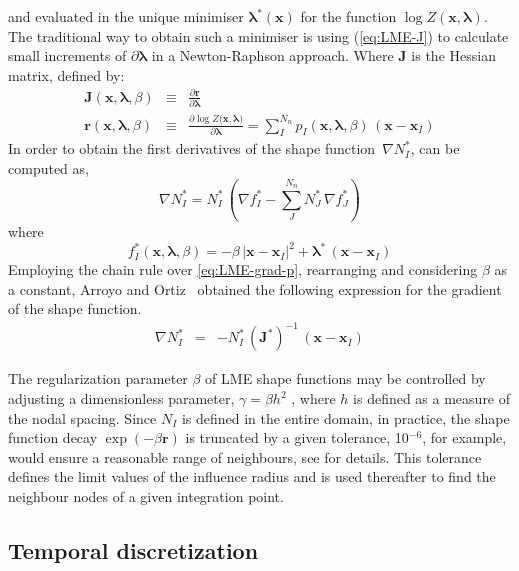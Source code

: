\documentclass[preprint,12pt,a4paper]{elsarticle}
\newcommand{\vec}[1]{
  \ensuremath{\mathbf{{#1}}}
}
\newcommand{\tens}[1]{
  \ensuremath{\mathbf{{#1}}}
}
\begin{document}
and evaluated in the unique minimiser $\vec{\lambda}^*(\vec{x})$ for
the function $\log
Z(\vec{x}, \vec{\lambda})$. The traditional way to obtain such a
minimiser is using (\ref{eq:LME-J}) to calculate small increments of $\partial\vec{\lambda}$ in a
Newton-Raphson approach. Where $\tens{J}$ is the Hessian matrix, defined by:
\begin{eqnarray}
  \label{eq:LME-J} 
  \tens{J}(\vec{x}, \vec{\lambda},\beta) &\equiv& \frac{\partial
                                                  \vec{r}}{\partial \vec{\lambda}}\\
  \label{eq:LME-r}
  \vec{r}(\vec{x},\vec{\lambda},\beta) &\equiv& \frac{\partial \log{ Z(   \vec{x},\vec{\lambda}})}{\partial \vec{\lambda}}  = \sum_I^{N_n} p_I(\vec{x},\vec{\lambda},\beta) \, (\vec{x} - \vec{x}_I)
\end{eqnarray}
In order to obtain the first derivatives of the shape function~$\nabla
N^*_I$, can be computed as,
\begin{equation}
  \label{eq:LME-grad-p}
\nabla N^*_I = N^*_I  \, \left(\nabla f^*_I-\sum_J^{N_n} N^*_J \, \nabla f^*_J\right)
\end{equation}
where
\begin{equation}
  \label{eq:LME-f}
f^*_I(\vec{x},  \vec{\lambda},\beta)=-\beta \, |\vec{x}-\vec{x}_I|^2 + \vec{\lambda}^*  \,  (\vec{x}-\vec{x}_I)
\end{equation}
Employing the chain rule over \eqref{eq:LME-grad-p}, rearranging and considering $\beta$ as a
constant, Arroyo and Ortiz~\cite{Arroyo2006} obtained the following
expression for the gradient of the shape function.
\begin{eqnarray}
  \label{eq:LME-gradp} 
\nabla N^*_I &=& -N^*_I \,  (\tens{J}^*)^{-1} \,  (\vec{x} - \vec{x}_I)
\end{eqnarray}

The regularization parameter $\beta$ of LME shape functions may be
controlled by adjusting a dimensionless parameter, $\gamma=\beta h^2$
\cite{Arroyo2006}, where $h$ is defined as a measure of the nodal
spacing. Since  $N_I$ is defined in the entire domain, in practice,
the shape function decay $\exp(-\beta \vec{r} )$ is truncated  by  a
given tolerance, 10$^{-6}$, for example,  would ensure a reasonable range of
neighbours, see \cite{Arroyo2006} for details. This tolerance defines
the limit values of the influence radius and is used thereafter to
find the neighbour nodes of a given integration point.

\subsection{Temporal discretization}
\label{sec:2.3}
\end{document}
